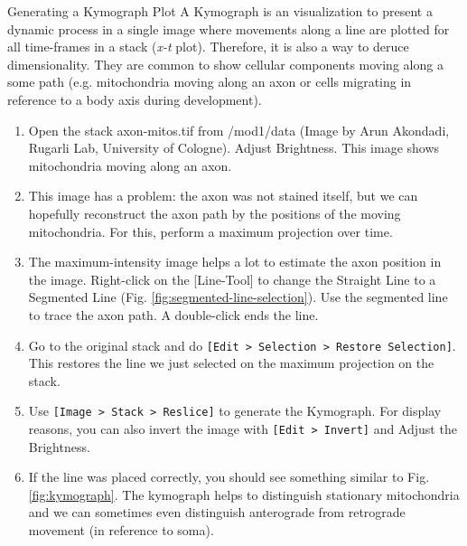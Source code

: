 \begin{taskbox}{Generating a Kymograph Plot}
A Kymograph is an visualization to present a dynamic process in a single image where movements along a line are plotted for all time-frames in a stack (\emph{x-t} plot). Therefore, it is also a way to deruce dimensionality. They are common to show cellular components moving along a some path (e.g. mitochondria moving along an axon or cells migrating in reference to a body axis during development).

\begin{enumerate}
	\item Open the stack axon-mitos.tif from /mod1/data (Image by Arun Akondadi, Rugarli Lab, University of Cologne). Adjust Brightness. This image shows mitochondria moving along an axon.
	\item This image has a problem: the axon was not stained itself, but we can hopefully reconstruct the axon path by the positions of the moving mitochondria. For this, perform a maximum projection over time.
	\item The maximum-intensity image helps a lot to estimate the axon position in the image. Right-click on the [Line-Tool] to change the Straight Line to a Segmented Line (Fig. \ref{fig:segmented-line-selection}). Use the segmented line to trace the axon path. A double-click ends the line.	
	
	\begin{minipage}[t]{\linewidth}
		\begin{center}
		\medskip
		\label{fig:segmented-line-selection}
		\end{center}
	\end{minipage}
	
	\item Go to the original stack and do \texttt{[Edit > Selection > Restore Selection]}. This restores the line we just selected on the maximum projection on the stack.
	\item Use \texttt{[Image > Stack > Reslice]} to generate the Kymograph. For display reasons, you can also invert the image with \texttt{[Edit > Invert]} and Adjust the Brightness.
	\item If the line was placed correctly, you should see something similar to Fig. \ref{fig:kymograph}. The kymograph helps to distinguish stationary mitochondria and we can sometimes even distinguish anterograde from retrograde movement (in reference to soma).	
	

\end{enumerate}
\end{taskbox}
